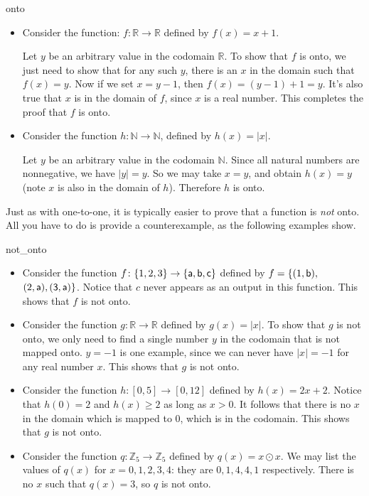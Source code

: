 \begin{example}{onto}
\begin{itemize}
\item
 Consider the  function: $f\colon \mathbb{R} \to \mathbb{R}$ defined by $f(x)=x +1$.

Let $y$ be an arbitrary value in the codomain $\mathbb{R}$. To show that $f$ is onto, we just need to show that for any such $y$, there is an $x$ in the domain such that $f(x)=y$. Now if we set $x=y-1$, then $f(x) = (y-1)+1 = y$. It's also true that $x$ is in the domain of $f$, since $x$ is a real number. This completes the proof that $f$ is onto.

\item 
Consider the function 
$h\colon \mathbb{N} \to \mathbb{N}$, defined by $h(x)=|x|$.

Let $y$ be an arbitrary value in the codomain $\mathbb{N}$. Since all natural numbers are nonnegative, we have $|y|=y$.  So we may take $x = y$, and obtain $h(x) = y$ (note $x$ is also in the domain of $h$). Therefore $h$ is onto.
\end{itemize}
\end{example}

Just as with one-to-one, it is typically easier to prove that a function is \emph{not} onto. All you have to do is provide a counterexample, as the following examples show.

\begin{example}{not_onto} 
\begin{itemize}
\item
Consider the function $f\colon \{1,2,3\} \to \{\sf{a}, \sf{b},\sf{c}\}$ defined by $f=\{(1,\sf{b}),$ $(2,\sf{a}), (3,\sf{a})\}$.
Notice that $c$ never appears as an output in this function.  This shows that $f$ is not onto. 
\item
Consider the function $g\colon \mathbb{R} \to \mathbb{R}$ defined by $g(x)= |x|$. To show that $g$ is not onto, we only need to find a single number $y$ in the codomain that  is not mapped onto.  $y=-1$ is one example, since we can never have $|x|=-1$ for any real number $x$.  This shows that $g$ is not onto.
\item
Consider the function $h\colon [0,5] \to [0,12]$ defined by $h(x)= 2x+2$. Notice that $h(0)=2$ and $h(x)\ge 2$ as long as $x > 0$. It follows that there is no $x$ in the domain which is mapped to 0, which is in the codomain. This shows that $g$ is not onto.
\item
Consider the function $q\colon \mathbb{Z}_5 \to \mathbb{Z}_5$ defined by $q(x)= x \odot x $. We may list the values of $q(x)$ for $x = 0,1,2,3,4$: they are $0,1,4,4,1$ respectively. There is no $x$ such that $q(x) = 3$, so $q$ is not onto.
\end{itemize}
\end{example}

